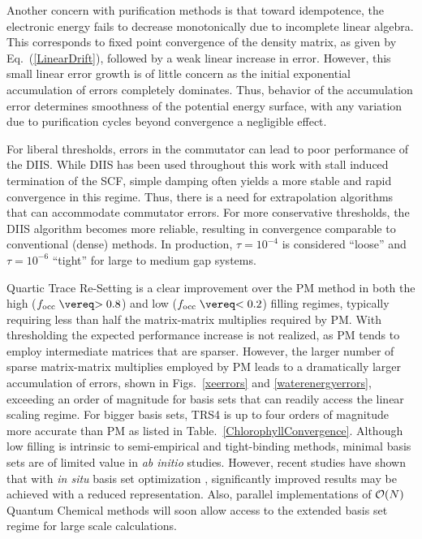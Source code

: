 \commentoutA{\documentclass[prb,aps,twocolumn,showpacs,twocolumngrid,superbib]{revtex4}}
\begin{document}
Another concern with purification methods is that toward idempotence, the electronic energy 
fails to decrease monotonically \cite{APalser98,DBowler99} due to incomplete linear algebra.  
This corresponds to fixed point convergence of the density matrix, as given 
by Eq.~(\ref{LinearDrift}), followed by a weak linear increase in error.  However, this small 
linear error growth is of little concern as the initial exponential accumulation of errors 
completely dominates.  Thus, behavior of the accumulation error determines smoothness of the
potential energy surface, with any variation due to purification cycles beyond convergence
a negligible effect.   

For liberal thresholds, errors in the commutator can lead to poor performance
of the DIIS.  While DIIS has been used throughout this work with stall induced termination of 
the SCF, simple damping often yields a more stable and rapid convergence in this regime.  Thus, 
there is a need for extrapolation algorithms that can accommodate commutator errors.  For more 
conservative thresholds, the DIIS algorithm becomes more reliable, resulting in convergence 
comparable to conventional (dense) methods.  In production, $\tau=10^{-4}$ is considered 
``loose'' and $\tau=10^{-6}$ ``tight'' for large to medium gap systems.  

Quartic Trace Re-Setting is a clear improvement over the PM method in both the high 
($f_{\rm occ}\gtrsim 0.8$) and low ($f_{\rm occ} \lesssim 0.2$) filling regimes,  typically requiring
less than half the matrix-matrix multiplies required by PM.  With thresholding the expected performance 
increase is not realized, as PM tends to employ intermediate matrices that are sparser.  
However, the larger number of sparse matrix-matrix multiplies employed by PM leads to a dramatically larger 
accumulation of errors, shown in Figs.~\ref{xeerrors} and \ref{waterenergyerrors}, exceeding an order of 
magnitude for basis sets that can readily access the linear scaling regime.
For bigger basis sets,  TRS4 is up to four orders of magnitude more accurate than PM as listed in 
Table.~\ref{ChlorophyllConvergence}.  Although low filling is intrinsic to semi-empirical and tight-binding methods, 
minimal basis sets are of limited value in {\em ab initio} studies.  However, recent studies have shown that with 
{\em in situ} basis set optimization \cite{GBerghold02,EHernandez95,MLee97,JTalman01}, significantly improved results may 
be achieved with a reduced representation.  Also, parallel implementations of ${\cal O}(N)$ Quantum Chemical
methods \cite{MChallacombe99,CGan03} will soon allow access to the extended basis set regime for large scale calculations.
\end{document}
